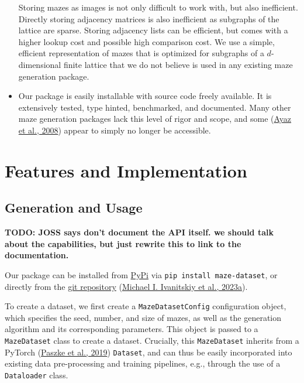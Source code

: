 \documentclass[10pt,a4paper,onecolumn]{article}
\begin{document}
\begin{itemize}
  Storing mazes as images is not only difficult to work with, but also
  inefficient. Directly storing adjacency matrices is also inefficient
  as subgraphs of the lattice are sparse. Storing adjacency lists can be
  efficient, but comes with a higher lookup cost and possible high
  comparison cost. We use a simple, efficient representation of mazes
  that is optimized for subgraphs of a \(d\)-dimensional finite lattice
  that we do not believe is used in any existing maze generation
  package.
\item
  Our package is easily installable with source code freely available.
  It is extensively tested, type hinted, benchmarked, and documented.
  Many other maze generation packages lack this level of rigor and
  scope, and some (\protect\hyperlink{ref-ayaz2008maze}{Ayaz et al.,
  2008}) appear to simply no longer be accessible.
\end{itemize}

\hypertarget{features-and-implementation}{%
\section{Features and
Implementation}\label{features-and-implementation}}

\hypertarget{generation}{%
\subsection{Generation and Usage}\label{generation}}

\textbf{TODO: JOSS says don't document the API itself. we should talk
about the capabilities, but just rewrite this to link to the
documentation.}

Our package can be installed from
\href{https://pypi.org/project/maze-dataset/}{PyPi} via
\texttt{pip\ install\ maze-dataset}, or directly from the
\href{https://github.com/understanding-search/maze-dataset}{git
repository} (\protect\hyperlink{ref-maze-dataset-github}{Michael I.
Ivanitskiy et al., 2023a}).

To create a dataset, we first create a \texttt{MazeDatasetConfig}
configuration object, which specifies the seed, number, and size of
mazes, as well as the generation algorithm and its corresponding
parameters. This object is passed to a \texttt{MazeDataset} class to
create a dataset. Crucially, this \texttt{MazeDataset} inherits from a
PyTorch (\protect\hyperlink{ref-pytorch}{Paszke et al., 2019})
\texttt{Dataset}, and can thus be easily incorporated into existing data
pre-processing and training pipelines, e.g., through the use of a
\texttt{Dataloader} class.
\end{document}
